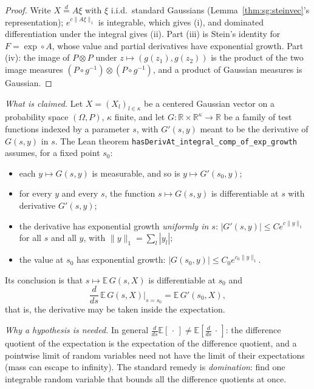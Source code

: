 \begin{proof}
  \leanok
Write $X\overset d=A\xi$ with $\xi$ i.i.d.\ standard Gaussians (Lemma~\ref{thm:sg:steinvec}'s representation); $e^{c\|A\xi\|_1}$ is integrable, which
gives (i), and dominated differentiation under the integral gives (ii). Part (iii) is Stein's identity for $F=\exp\circ A$, whose value and partial
derivatives have exponential growth. Part (iv): the image of $P\otimes P$ under $z\mapsto(g(z_1),g(z_2))$ is the product of the two image measures $(P\circ g^{-1})\otimes(P\circ g^{-1})$, and a product of Gaussian measures is Gaussian.
\end{proof}

\begin{remark}\label{rem:sg:dominated-differentiation}
\emph{What is claimed.} Let $X=(X_l)_{l\in\kappa}$ be a centered Gaussian vector on a probability space $(\Omega,P)$, $\kappa$ finite, and let $G:\mathbb R\times\mathbb R^\kappa\to\mathbb R$ be a family of test functions
indexed by a parameter $s$, with $G'(s,y)$ meant to be the derivative of $G(s,y)$ in $s$. The Lean theorem \texttt{hasDerivAt\_integral\_comp\_of\_exp\_growth} assumes, for a fixed point $s_0$:
\begin{itemize}
\item each $y\mapsto G(s,y)$ is measurable, and so is $y\mapsto G'(s_0,y)$;
\item for every $y$ and every $s$, the function $s\mapsto G(s,y)$ is differentiable at $s$ with derivative $G'(s,y)$;
\item the derivative has exponential growth \emph{uniformly in $s$}: $|G'(s,y)|\le Ce^{c\|y\|_1}$ for all $s$ and all $y$, with $\|y\|_1=\sum_l|y_l|$;
\item the value at $s_0$ has exponential growth: $|G(s_0,y)|\le C_0e^{c_0\|y\|_1}$.
\end{itemize}
Its conclusion is that $s\mapsto\mathbb E\,G(s,X)$ is differentiable at $s_0$ and
\[
\frac{d}{ds}\,\mathbb E\,G(s,X)\Big|_{s=s_0}=\mathbb E\,G'(s_0,X),
\]
that is, the derivative may be taken inside the expectation.

\emph{Why a hypothesis is needed.} In general $\frac{d}{ds}\mathbb E[\,\cdot\,]\neq\mathbb E[\frac{d}{ds}\,\cdot\,]$: the difference quotient of the expectation is the expectation of the difference quotient, and a pointwise limit of
random variables need not have the limit of their expectations (mass can escape to infinity). The standard remedy is \emph{domination}: find one integrable random variable that bounds all the difference quotients at once.


\end{remark}
